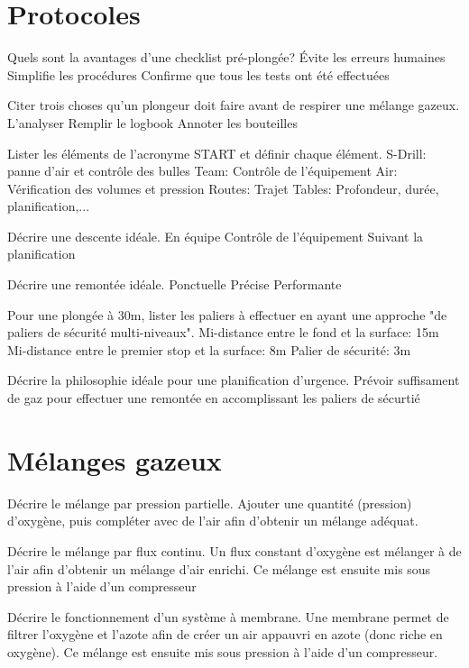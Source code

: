 \documentclass[english,12pt,a4paper]{article}
\begin{document}
	\section{Protocoles}
	\begin{outline}
		\1 Quels sont la avantages d'une checklist pré-plongée?
			\2 Évite les erreurs humaines
			\2 Simplifie les procédures
			\2 Confirme que tous les tests ont été effectuées

		\1 Citer trois choses qu'un plongeur doit faire avant de respirer une mélange gazeux.
			\2 L'analyser
			\2 Remplir le logbook
			\2 Annoter les bouteilles

		\1 Lister les éléments de l'acronyme START et définir chaque élément.
			\2[S] S-Drill: panne d'air et contrôle des bulles
			\2[T] Team: Contrôle de l'équipement
			\2[A] Air: Vérification des volumes et pression
			\2[R] Routes: Trajet
			\2[T] Tables: Profondeur, durée, planification,...

		\1 Décrire une descente idéale.
			\2 En équipe
			\2 Contrôle de l'équipement
			\2 Suivant la planification

		\1 Décrire une remontée idéale.
			\2 Ponctuelle
			\2 Précise
			\2 Performante

		\1 Pour une plongée à 30m, lister les paliers à effectuer en ayant une approche "de paliers de sécurité multi-niveaux".
			\2 Mi-distance entre le fond et la surface: 15m
			\2 Mi-distance entre le premier stop et la surface: 8m
			\2 Palier de sécurité: 3m

		\1 Décrire la philosophie idéale pour une planification d'urgence.
			\2 Prévoir suffisament de gaz pour effectuer une remontée en accomplissant les paliers de sécurtié
	\end{outline}
	\pagebreak

	\section{Mélanges gazeux}
	\begin{outline}
		\1 Décrire le mélange par pression partielle.
			\2 Ajouter une quantité (pression) d'oxygène, puis compléter avec de l'air afin d'obtenir un mélange adéquat. 

		\1 Décrire le mélange par flux continu.
			\2 Un flux constant d'oxygène est mélanger à de l'air afin d'obtenir un mélange d'air enrichi. Ce mélange est ensuite mis sous pression à l'aide d'un compresseur

		\1 Décrire le fonctionnement d'un système à membrane.
			\2 Une membrane permet de filtrer l'oxygène et l'azote afin de créer un air appauvri en azote (donc riche en oxygène). Ce mélange est ensuite mis sous pression à l'aide d'un compresseur.

	\end{outline}
	\pagebreak
\end{document}
